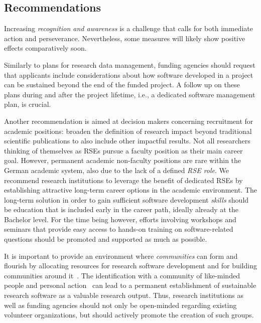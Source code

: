 \documentclass[a4paper,num-refs,numbers,sort&compress]{de-rse}
\begin{document}
\subsection{Recommendations}
Increasing \textit{recognition and awareness} is a challenge that calls for both immediate action and perseverance. Nevertheless, some measures will likely show positive effects comparatively soon.

Similarly to plans for research data management, funding agencies should request that applicants include considerations about how software developed in a project can be sustained beyond the end of the funded project. A follow up on these plans during and after the project lifetime, i.e., a dedicated software management plan, is crucial.

Another recommendation is aimed at decision makers concerning recruitment for academic positions: broaden the definition of research impact beyond traditional scientific publications to also include other impactful results.
%
Not all researchers thinking of themselves as RSEs pursue a faculty position as their main career goal.
However, permanent academic non-faculty positions are rare within the German academic system, also due to the lack of a defined \textit{RSE role}.
We recommend research institutions to leverage the benefit of dedicated RSEs by establishing attractive long-term career options in the academic environment.
%
The long-term solution in order to gain sufficient software development \textit{skills} should be education that is included early in the career path, ideally already at the Bachelor level.
For the time being however, efforts involving workshops and seminars that provide easy access to hands-on training on software-related questions should be promoted and supported as much as possible.

It is important to provide an environment where \textit{communities} can form and flourish by allocating resources for research software development and for building communities around it~\cite{Katz19community,iaffaldano2019developers,Jimnez2017}.
The identification with a community of like-minded people and personal action~\cite{dagstuhl} can lead to a permanent establishment of sustainable research software as a valuable research output.
Thus, research institutions as well as funding agencies should not only be open-minded regarding existing volunteer organizations, but should actively promote the creation of such groups.


\end{document}
